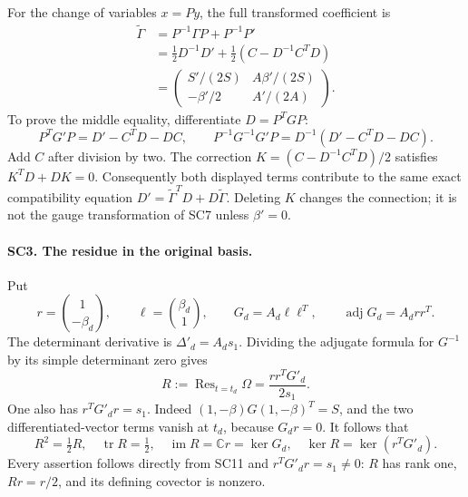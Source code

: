 \documentclass[11pt,a4paper]{article}
\theoremstyle{definition}\newtheorem{definition}[theorem]{Definition}
\begin{document}
For the change of variables \(x=Py\), the full transformed
coefficient is
\[
 \begin{split}
 \widetilde\Gamma
 &=P^{-1}\Gamma P+P^{-1}P'\\
 &=\frac12D^{-1}D'+\frac12(C-D^{-1}C^TD)\\
 &=\begin{pmatrix}
       S'/(2S)&A\beta'/(2S)\\
       -\beta'/2&A'/(2A)
    \end{pmatrix}.
 \end{split}\tag{SC9}
\]
To prove the middle equality, differentiate \(D=P^TGP\):
\[
 P^TG'P=D'-C^TD-DC,\qquad
 P^{-1}G^{-1}G'P=D^{-1}(D'-C^TD-DC).
\]
Add \(C\) after division by two. The correction
\(K=(C-D^{-1}C^TD)/2\) satisfies \(K^TD+DK=0\).
Consequently both displayed terms contribute to the same exact
compatibility equation \(D'=\widetilde\Gamma^TD+
D\widetilde\Gamma\). Deleting \(K\) changes the connection; it
is not the gauge transformation of SC7 unless \(\beta'=0\).

\paragraph{SC3. The residue in the original basis.}
Put
\[
 r=\binom{1}{-\beta_d},\qquad
 \ell=\binom{\beta_d}{1},\qquad
 G_d=A_d\ell\ell^T,\qquad
 \operatorname{adj}G_d=A_drr^T .
 \tag{SC10}
\]
The determinant derivative is \(\Delta'_d=A_ds_1\).
Dividing the adjugate formula for \(G^{-1}\) by its simple
determinant zero gives
\[
 R:=\operatorname{Res}_{t=t_d}\Omega
   =\frac{r r^TG'_d}{2s_1}.
 \tag{SC11}
\]
One also has \(r^TG'_dr=s_1\). Indeed
\((1,-\beta)G(1,-\beta)^T=S\), and the two differentiated-vector
terms vanish at \(t_d\), because \(G_dr=0\). It follows that
\[
 R^2=\tfrac12R,\quad
 \operatorname{tr}R=\tfrac12,\quad
 \operatorname{im}R=\mathbb Cr=\ker G_d,\quad
 \ker R=\ker(r^TG'_d).
 \tag{SC12}
\]
Every assertion follows directly from SC11 and
\(r^TG'_dr=s_1\ne0\): \(R\) has rank one, \(Rr=r/2\),
and its defining covector is nonzero.
\end{document}
